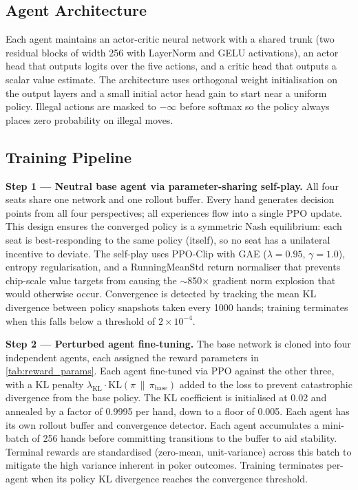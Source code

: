 \documentclass{article}
\begin{document}
\subsection{Agent Architecture}

Each agent maintains an actor-critic neural network with a shared trunk (two residual blocks of width 256 with LayerNorm \citep{ba2016layernormalization} and GELU \citep{hendrycks2023gaussianerrorlinearunits} activations), an actor head that outputs logits over the five actions, and a critic head that outputs a scalar value estimate. The architecture uses orthogonal weight initialisation on the output layers and a small initial actor head gain to start near a uniform policy. Illegal actions are masked to $-\infty$ before softmax so the policy always places zero probability on illegal moves.

\subsection{Training Pipeline}

\textbf{Step 1 --- Neutral base agent via parameter-sharing self-play.} All four seats share one network and one rollout buffer. Every hand generates decision points from all four perspectives; all experiences flow into a single PPO update. This design ensures the converged policy is a symmetric Nash equilibrium: each seat is best-responding to the same policy (itself), so no seat has a unilateral incentive to deviate. The self-play uses PPO-Clip \citep{schulman2017proximal} with GAE ($\lambda = 0.95$, $\gamma = 1.0$), entropy regularisation, and a RunningMeanStd return normaliser that prevents chip-scale value targets from causing the $\sim$850$\times$ gradient norm explosion that would otherwise occur. Convergence is detected by tracking the mean KL divergence between policy snapshots taken every 1000 hands; training terminates when this falls below a threshold of $2\times10^{-4}$.

\textbf{Step 2 --- Perturbed agent fine-tuning.} The base network is cloned into four independent agents, each assigned the reward parameters in \cref{tab:reward_params}. Each agent fine-tuned via PPO against the other three, with a KL penalty $\lambda_{\text{KL}} \cdot \text{KL}(\pi \,\|\, \pi_{\text{base}})$ added to the loss to prevent catastrophic divergence from the base policy. The KL coefficient is initialised at 0.02 and annealed by a factor of 0.9995 per hand, down to a floor of 0.005. Each agent has its own rollout buffer and convergence detector. Each agent accumulates a mini-batch of 256 hands before committing transitions to the buffer to aid stability. Terminal rewards are standardised (zero-mean, unit-variance) across this batch to mitigate the high variance inherent in poker outcomes. Training terminates per-agent when its policy KL divergence reaches the convergence threshold.
\end{document}
